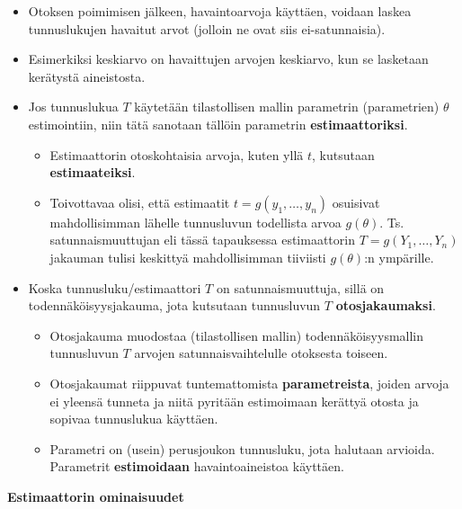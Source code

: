 \documentclass[
]{book}
\providecommand{\tightlist}{%
  \setlength{\itemsep}{0pt}\setlength{\parskip}{0pt}}
\begin{document}
\begin{itemize}
\item
  Otoksen poimimisen jälkeen, havaintoarvoja käyttäen, voidaan laskea tunnuslukujen havaitut arvot (jolloin ne ovat siis ei-satunnaisia).
\item
  Esimerkiksi keskiarvo on havaittujen arvojen keskiarvo, kun se lasketaan kerätystä aineistosta.
\item
  Jos tunnuslukua \(T\) käytetään tilastollisen mallin parametrin (parametrien) \(\theta\) estimointiin, niin tätä sanotaan tällöin parametrin \textbf{estimaattoriksi}.

  \begin{itemize}
  \tightlist
  \item
    Estimaattorin otoskohtaisia arvoja, kuten yllä \(t\), kutsutaan \textbf{estimaateiksi}.
  \item
    Toivottavaa olisi, että estimaatit \(t = g(y_1, \ldots, y_n)\) osuisivat mahdollisimman lähelle tunnusluvun todellista arvoa \(g(\theta)\). Ts. satunnaismuuttujan eli tässä tapauksessa estimaattorin \(T=g(Y_1, \ldots, Y_n)\) jakauman tulisi keskittyä mahdollisimman tiiviisti \(g(\theta)\):n ympärille.
  \end{itemize}
\item
  Koska tunnusluku/estimaattori \(T\) on satunnaismuuttuja, sillä on todennäköisyysjakauma, jota kutsutaan tunnusluvun \(T\) \textbf{otosjakaumaksi}.

  \begin{itemize}
  \tightlist
  \item
    Otosjakauma muodostaa (tilastollisen mallin) todennäköisyysmallin tunnusluvun \(T\) arvojen satunnaisvaihtelulle otoksesta toiseen.
  \item
    Otosjakaumat riippuvat tuntemattomista \textbf{parametreista}, joiden arvoja ei yleensä tunneta ja niitä pyritään estimoimaan kerättyä otosta ja sopivaa tunnuslukua käyttäen.
  \item
    Parametri on (usein) perusjoukon tunnusluku, jota halutaan arvioida. Parametrit \textbf{estimoidaan} havaintoaineistoa käyttäen.
  \end{itemize}
\end{itemize}

\hfill\break
\hfill\break
\hfill\break
\hfill\break

\textbf{Estimaattorin ominaisuudet}
\end{document}
